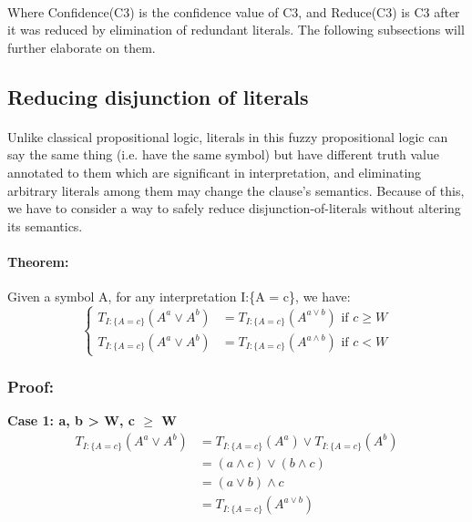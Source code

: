 \documentclass[part1.tex]{subfiles}
\begin{document}
\paragraph{} Where Confidence(C3) is the confidence value of
C3, and Reduce(C3) is C3 after it was reduced by elimination of
redundant literals. The following subsections will further
elaborate on them.

\subsection{Reducing disjunction of literals}
\paragraph{} Unlike classical propositional logic,
literals in this fuzzy propositional logic can say the same thing
(i.e. have the same symbol) but have different truth value
annotated to them which are significant in interpretation, and
eliminating arbitrary literals among them may change the clause's
semantics. Because of this, we have to consider a way to safely
reduce disjunction-of-literals without altering its semantics.
\paragraph{Theorem:} Given a symbol A, for any interpretation
I:\{A = c\}, we have:
\[
   \begin{cases}
           T_{I:\{A = c\}}(A^{a} \vee A^{b}) &=  T_{I:\{A =
           c\}}(A^{a \vee b})  \text{ if } c \ge W \\

           T_{I:\{A = c\}}(A^{a} \vee A^{b}) &=  T_{I:\{A =
           c\}}(A^{a \wedge b}) \text{ if } c < W
   \end{cases}
\]

\subsubsection{Proof:}
{\bfseries Case 1: a, b > W, c $\ge$ W}
\begin{align*}
        T_{I:\{A = c\}}(A^{a} \vee A^{b}) &= T_{I:\{A =
                 c\}}(A^{a}) \vee T_{I:\{A = c\}}(A^{b}) \\
                 &= (a \wedge c) \vee (b \wedge c) \\
                 &= (a \vee b) \wedge c \\
                 &= T_{I:\{A = c\}}(A^{a \vee b}) \\
\end{align*}
\end{document}
